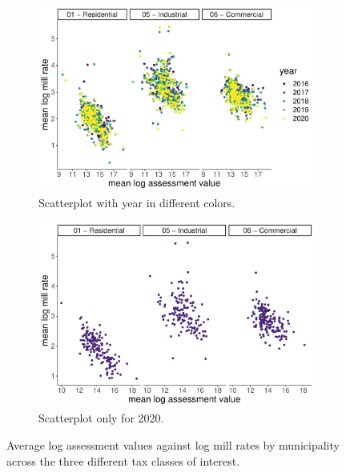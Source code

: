 \documentclass{article}
\begin{document}
\begin{figure}[ht]
\centering
\begin{subfigure}{.5\textwidth}
  \centering
  \includegraphics[width=.9\textwidth]{figures/1. scatter with year.pdf}
  \caption{Scatterplot with year in different colors.}
  \label{fig:scatter_year}
\end{subfigure}%
\begin{subfigure}{.5\textwidth}
  \centering
  \includegraphics[width=.9\textwidth]{figures/2. scatter 2020 by municipality.pdf}
  \caption{Scatterplot only for 2020.}
  \label{fig:scatter_2020}
\end{subfigure}
\caption{Average log assessment values against log mill rates by municipality across the three different tax classes of interest.}
\label{fig:scatter}
\end{figure}


\end{document}
